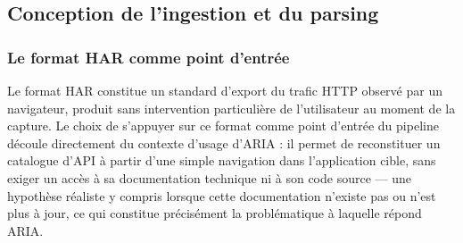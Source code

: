 
\subsection{Conception de l'ingestion et du parsing}

\subsubsection{Le format HAR comme point d'entrée}

Le format HAR constitue un standard d'export du trafic HTTP observé par un navigateur, produit sans intervention particulière de l'utilisateur au moment de la capture. Le choix de s'appuyer sur ce format comme point d'entrée du pipeline découle directement du contexte d'usage d'ARIA : il permet de reconstituer un catalogue d'API à partir d'une simple navigation dans l'application cible, sans exiger un accès à sa documentation technique ni à son code source — une hypothèse réaliste y compris lorsque cette documentation n'existe pas ou n'est plus à jour, ce qui constitue précisément la problématique à laquelle répond ARIA.

